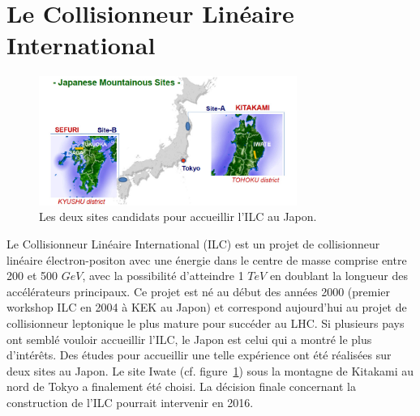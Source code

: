 \section{Le Collisionneur Linéaire International}
\begin{figure}[!ht]
  \begin{center}
    \includegraphics[width=0.75\textwidth]{ILC/figs/japanese_sites.jpg}
    \caption{Les deux sites candidats pour accueillir l'ILC au Japon.}
    \label{fig:japanese_sites}
  \end{center}
\end{figure}
Le Collisionneur Linéaire International (ILC) est un projet de collisionneur linéaire électron-positon avec une énergie dans le centre de masse comprise entre 200 et 500 $GeV$, avec la possibilité d'atteindre 1 $TeV$ en doublant la  longueur des accélérateurs principaux. Ce projet est né au début des années 2000 (premier workshop ILC en 2004 à KEK au Japon) et correspond aujourd'hui au projet de collisionneur leptonique le plus mature pour succéder au LHC. Si plusieurs pays ont semblé vouloir accueillir l'ILC, le Japon est celui qui a montré le plus d'intérêts. Des études pour accueillir une telle expérience ont été réalisées sur deux sites au Japon. Le site Iwate (cf. figure~\ref{fig:japanese_sites}) sous la montagne de Kitakami au nord de Tokyo a finalement été choisi. La décision finale concernant la construction de l'ILC pourrait intervenir en 2016. 

